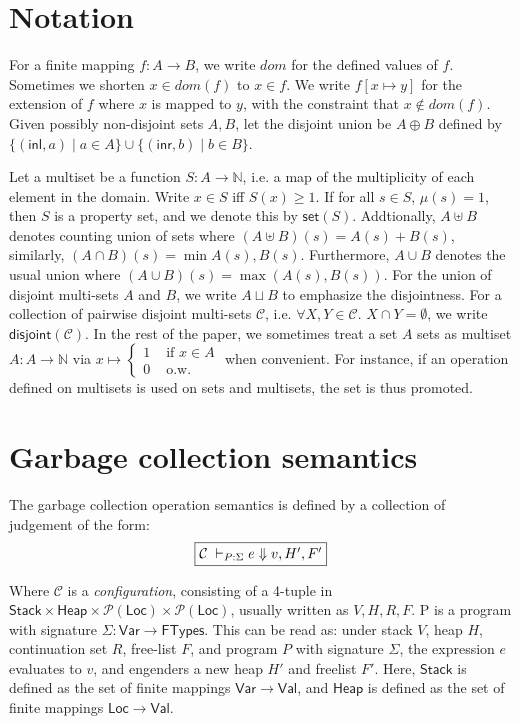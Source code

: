 \documentclass[11pt]{article}
\newcommand{\ms}[1]{\ensuremath{\mathsf{#1}}}
\newcommand{\dist}[1]{\mathsf{disjoint}(#1)}
\theoremstyle{definition}
\begin{document}
\newpage

\section{Notation}
\noindent 
For a finite mapping $f : A \to B$, we write $dom$ for the defined values of $f$. Sometimes we shorten $x \in dom(f)$ to $x \in f$. We write $f[x \mapsto y]$ for the extension of $f$ where $x$ is mapped to $y$, with the constraint that $x \notin dom(f)$. \\

Given possibly non-disjoint sets $A,B$, let the disjoint union be $A \oplus B$ defined by 
$\{(\ms{inl},a) \mid a \in A\} \cup \{(\ms{inr},b) \mid b \in B\}$.

Let a multiset be a function $S : A \to \mathbb{N}$, i.e. a map of the multiplicity of each element in the domain. 
Write $x \in S$ iff $S(x) \ge 1$. If for all  $s \in S$, $\mu(s) = 1$, then $S$ is a property set, 
and we denote this by $\ms{set}(S)$. Addtionally, $A \uplus B$ denotes counting union of sets where 
$(A \uplus B) (s) = A (s) + B(s)$, similarly, $(A \cap B)(s) = \min{A(s),B(s)}$. Furthermore,
 $A \cup B$ denotes the usual union where 
$(A \cup B)(s) = \max{(A(s),B(s))}$. 
For the union of disjoint multi-sets $A$ and $B$, we write $A \sqcup B$ to emphasize the disjointness.
For a collection of pairwise disjoint multi-sets $\mathcal{C}$, i.e. $\forall X,Y \in \mathcal{C}$. $X \cap Y = \emptyset$, we write $\dist{\mathcal{C}}$.
In the rest of the paper, 
we sometimes treat a set $A$ sets as multiset $A : A \to \mathbb{N}$ via 
$x \mapsto \begin{cases} 1 &\text{ if } x \in A \\0 &\text{ o.w.}\end{cases}$ when convenient. 
For instance, if an operation 
defined on multisets is used on sets and multisets, the set is thus promoted.\\

\section{Garbage collection semantics}



The garbage collection operation semantics is defined by a collection of judgement of the form:
\[
\fbox{$\mathcal{C} \; \vdash_{P : \Sigma} e \Downarrow v, H', F'$}
\]

\noindent
Where $\mathcal{C}$ is a \emph{configuration}, consisting of a 4-tuple in 
$\ms{Stack} \times \ms{Heap} \times \mathcal{P}(\ms{Loc}) \times \mathcal{P}(\ms{Loc})$, 
usually written as $V,H,R,F$. 
P is a program with signature $\Sigma : \ms{Var} \to \ms{FTypes}$. 
This can be read as: under stack $V$, heap $H$, continuation set $R$,
free-list $F$, and program $P$ with signature $\Sigma$, the expression $e$ evaluates to $v$, and engenders a new heap $H'$ and freelist $F'$. Here, $\ms{Stack}$ is defined as the set of finite mappings $\ms{Var} \to \ms{Val}$, and $\ms{Heap}$ is defined as the set of finite mappings $\ms{Loc} \to \ms{Val}$.\\
\end{document}
